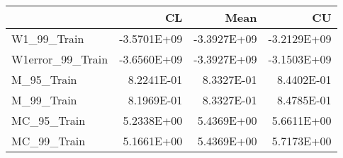 \begin{tabular}{lrrr}
\toprule
{} &          CL &        Mean &          CU \\
\midrule
W1\_99\_Train      & -3.5701E+09 & -3.3927E+09 & -3.2129E+09 \\
W1error\_99\_Train & -3.6560E+09 & -3.3927E+09 & -3.1503E+09 \\
M\_95\_Train       &  8.2241E-01 &  8.3327E-01 &  8.4402E-01 \\
M\_99\_Train       &  8.1969E-01 &  8.3327E-01 &  8.4785E-01 \\
MC\_95\_Train      &  5.2338E+00 &  5.4369E+00 &  5.6611E+00 \\
MC\_99\_Train      &  5.1661E+00 &  5.4369E+00 &  5.7173E+00 \\
\bottomrule
\end{tabular}
